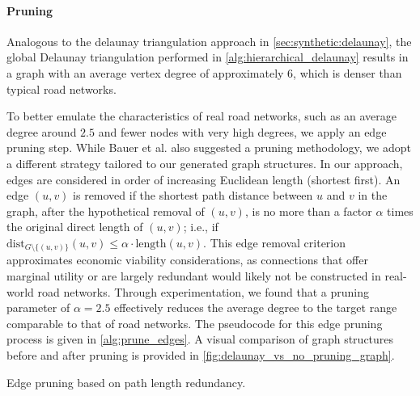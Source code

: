 \paragraph{Pruning}
\label{sec:synthetic:hierarchical_delaunay:pruning}


Analogous to the delaunay triangulation approach in \cref{sec:synthetic:delaunay}, the global Delaunay triangulation performed in \cref{alg:hierarchical_delaunay} results in a graph with an average vertex degree of approximately 6, which is denser than typical road networks.

To better emulate the characteristics of real road networks, such as an average degree around \(2.5\) and fewer nodes with very high degrees, we apply an edge pruning step.
While Bauer et al. \cite{hutchison_synthetic_2010} also suggested a pruning methodology, we adopt a different strategy tailored to our generated graph structures.
In our approach, edges are considered in order of increasing Euclidean length (shortest first).
An edge \((u,v)\) is removed if the shortest path distance between \(u\) and \(v\) in the graph, after the hypothetical removal of \((u,v)\), is no more than a factor \(\alpha\) times the original direct length of \((u,v)\); i.e., if \( \text{dist}_{G \setminus \{(u,v)\}}(u,v) \le \alpha \cdot \text{length}(u,v) \).
This edge removal criterion approximates economic viability considerations, as connections that offer marginal utility or are largely redundant would likely not be constructed in real-world road networks.
Through experimentation, we found that a pruning parameter of \(\alpha = 2.5\) effectively reduces the average degree to the target range comparable to that of road networks.
The pseudocode for this edge pruning process is given in \cref{alg:prune_edges}.
A visual comparison of graph structures before and after pruning is provided in \cref{fig:delaunay_vs_no_pruning_graph}.

\begin{algorithm}[tbhp]
	\BlankLine
	\caption{Edge pruning based on path length redundancy.}
	\label{alg:prune_edges}
\end{algorithm}

